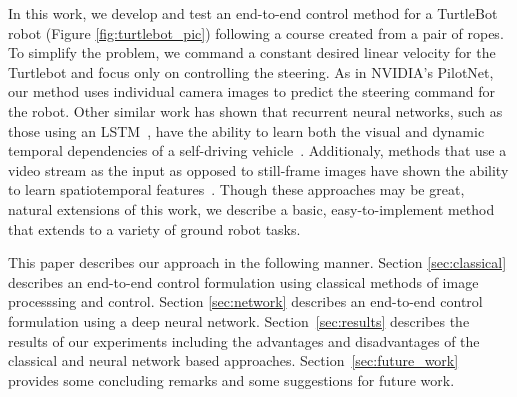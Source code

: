 In this work, we develop and test an end-to-end control method for a TurtleBot
robot (Figure \ref{fig:turtlebot_pic}) following a course created from a pair of
ropes. To simplify the problem, we command a constant desired linear velocity
for the Turtlebot and focus only on controlling the steering.
As in NVIDIA's PilotNet, our method uses
individual camera images to predict the steering command for the robot. Other
similar work has shown that recurrent neural networks, such as those using an
LSTM~\cite{xingjian2015convolutional}, have the ability to learn both the visual
and dynamic temporal dependencies of a self-driving vehicle~\cite{eraqi2017end}.
Additionaly, methods that use a video stream as the input as opposed to
still-frame images have shown the ability to learn spatiotemporal
features~\cite{tran2015learning}. Though these approaches may be great, natural
extensions of this work, we describe a basic, easy-to-implement method that
extends to a variety of ground robot tasks.

This paper describes our approach in the following manner. Section
\ref{sec:classical} describes an end-to-end control formulation using classical
methods of image processsing and control. Section \ref{sec:network} describes an
end-to-end control formulation using a deep neural network.
Section~\ref{sec:results} describes the results of our experiments including the
advantages and disadvantages of the classical and neural network based
approaches. Section~\ref{sec:future_work} provides some concluding remarks and
some suggestions for future work.







